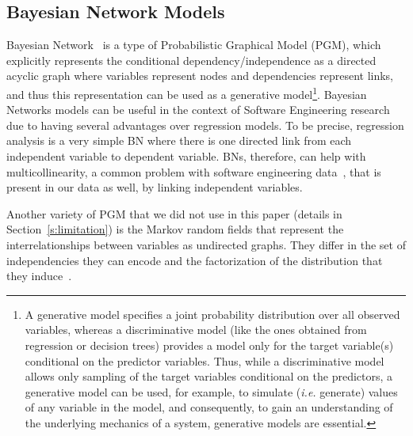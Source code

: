 \documentclass[smallcondensed]{svjour3}     %
\begin{document}
\subsection{Bayesian Network Models}
Bayesian Network~\cite{koller2009probabilistic,scutari2010introduction} 
is a type of Probabilistic Graphical Model (PGM), which explicitly represents the
conditional dependency/independence as a directed acyclic graph where variables
represent nodes and dependencies represent links, and thus this
representation can be used as a generative model\footnote{A
  generative model specifies a joint probability distribution over
  all observed variables, whereas a discriminative model
  (like the ones obtained from regression or decision trees) provides a
  model only for the target variable(s) conditional on the predictor
  variables. Thus, while a discriminative model allows only sampling
  of the target variables conditional on the predictors, a
  generative model can be used, for example, to simulate
  (\emph{i.e.} generate) values of any variable in the model, and
  consequently, to gain an understanding of the underlying mechanics
  of a system, generative models are essential.}.  
Bayesian Networks models can be useful in the context of Software Engineering research~\cite{fenton1999critique} due to having several advantages over
regression models. To be precise, regression analysis is a very
simple BN where there is one directed link from each independent variable
to dependent variable. BNs, therefore, can help with 
multicollinearity, a common problem with software engineering 
data~\cite{yu2002predicting,subramanyam2003empirical,briand2000exploring,Changes07}, 
that is present in our data as well, by linking independent variables. 

Another variety of PGM that we did not use in this paper 
(details in Section~\ref{s:limitation}) is the Markov random
fields that represent the interrelationships between variables 
as undirected graphs. They differ in the set of
independencies they can encode and the factorization of the
distribution that they induce~\cite{koller2009probabilistic}.
\end{document}
